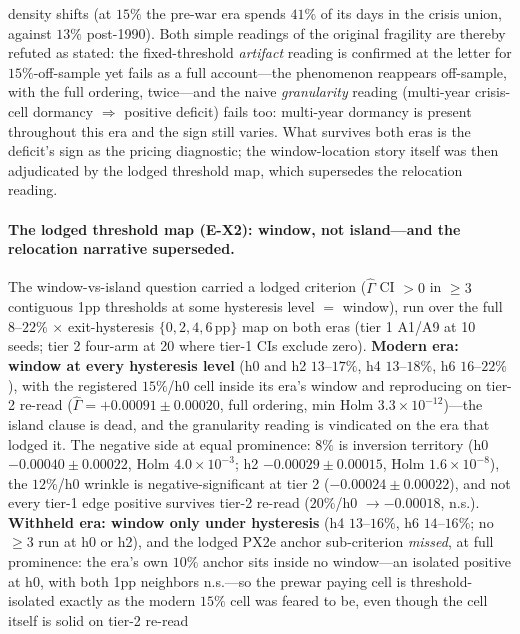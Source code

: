 \documentclass{article}
\begin{document}
density shifts
(at $15\%$ the pre-war era spends $41\%$ of its days in the crisis
union, against $13\%$ post-1990). Both simple readings of the original
fragility are thereby refuted as stated: the fixed-threshold
\emph{artifact} reading is confirmed at the letter for
$15\%$-off-sample yet fails as a full account---the phenomenon
reappears off-sample, with the full ordering, twice---and the naive
\emph{granularity} reading (multi-year crisis-cell dormancy
$\Rightarrow$ positive deficit) fails too: multi-year dormancy is
present throughout this era and the sign still varies. What survives
both eras is the deficit's sign as the pricing diagnostic; the
window-location story itself was then adjudicated by the lodged
threshold map, which supersedes the relocation reading.

\paragraph{The lodged threshold map (E-X2): window, not island---and
the relocation narrative superseded.} The window-vs-island question
carried a lodged criterion ($\hat\Gamma$ CI $> 0$ in $\ge 3$
contiguous 1pp thresholds at some hysteresis level $=$ window), run
over the full $8$--$22\%$ $\times$ exit-hysteresis
$\{0, 2, 4, 6\,\mathrm{pp}\}$ map on both eras (tier 1 A1/A9 at 10
seeds; tier 2 four-arm at 20 where tier-1 CIs exclude zero).
\textbf{Modern era: window at every hysteresis level} (h0 and h2
$13$--$17\%$, h4 $13$--$18\%$, h6 $16$--$22\%$), with the registered
$15\%$/h0 cell inside its era's window and reproducing on tier-2
re-read ($\hat\Gamma = +0.00091 \pm 0.00020$, full ordering, min
Holm $3.3\times10^{-12}$)---the island clause is dead, and the
granularity reading is vindicated on the era that lodged it. The
negative side at equal prominence: $8\%$ is inversion territory
(h0 $-0.00040 \pm 0.00022$, Holm $4.0\times10^{-3}$; h2
$-0.00029 \pm 0.00015$, Holm $1.6\times10^{-8}$), the $12\%$/h0
wrinkle is negative-significant at tier 2 ($-0.00024 \pm 0.00022$),
and not every tier-1 edge positive survives tier-2 re-read
($20\%$/h0 $\to -0.00018$, n.s.). \textbf{Withheld era: window only
under hysteresis} (h4 $13$--$16\%$, h6 $14$--$16\%$; no $\ge 3$ run
at h0 or h2), and the lodged PX2e anchor sub-criterion
\emph{missed}, at full prominence: the era's own $10\%$ anchor sits
inside no window---an isolated positive at h0, with both 1pp
neighbors n.s.---so the prewar paying cell is threshold-isolated
exactly as the modern $15\%$ cell was feared to be, even though the
cell itself is solid on tier-2 re-read
\end{document}
